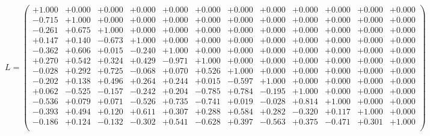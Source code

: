 \documentclass[9pt]{article}
\theoremstyle{plain}
\theoremstyle{definition}
\theoremstyle{remark}
\numberwithin{equation}{section}
\begin{document}
$L = \left(
\begin{array}{
cccccccccccc}
+1.000 & +0.000 & +0.000 & +0.000 & +0.000 & +0.000 & +0.000 & +0.000 & +0.000 & +0.000 & +0.000 & +0.000 \\
-0.715 & +1.000 & +0.000 & +0.000 & +0.000 & +0.000 & +0.000 & +0.000 & +0.000 & +0.000 & +0.000 & +0.000 \\
-0.261 & +0.675 & +1.000 & +0.000 & +0.000 & +0.000 & +0.000 & +0.000 & +0.000 & +0.000 & +0.000 & +0.000 \\
+0.147 & +0.140 & -0.673 & +1.000 & +0.000 & +0.000 & +0.000 & +0.000 & +0.000 & +0.000 & +0.000 & +0.000 \\
-0.362 & +0.606 & +0.015 & -0.240 & +1.000 & +0.000 & +0.000 & +0.000 & +0.000 & +0.000 & +0.000 & +0.000 \\
+0.270 & +0.542 & +0.324 & +0.429 & -0.971 & +1.000 & +0.000 & +0.000 & +0.000 & +0.000 & +0.000 & +0.000 \\
-0.028 & +0.292 & +0.725 & -0.068 & +0.070 & +0.526 & +1.000 & +0.000 & +0.000 & +0.000 & +0.000 & +0.000 \\
-0.202 & +0.138 & +0.496 & +0.264 & +0.244 & +0.015 & -0.597 & +1.000 & +0.000 & +0.000 & +0.000 & +0.000 \\
+0.062 & -0.525 & -0.157 & -0.242 & +0.204 & -0.785 & +0.784 & -0.195 & +1.000 & +0.000 & +0.000 & +0.000 \\
-0.536 & +0.079 & +0.071 & -0.526 & +0.735 & -0.741 & +0.019 & -0.028 & +0.814 & +1.000 & +0.000 & +0.000 \\
-0.393 & +0.494 & +0.120 & +0.611 & +0.307 & +0.288 & +0.584 & +0.282 & -0.320 & +0.117 & +1.000 & +0.000 \\
-0.186 & +0.124 & -0.132 & -0.302 & +0.541 & -0.628 & +0.397 & -0.563 & +0.375 & -0.471 & +0.301 & +1.000 \\
\end{array}
\right)$ \newline 
\end{document}
